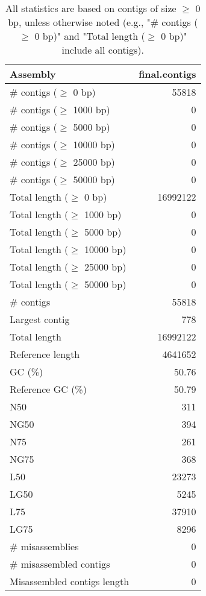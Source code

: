 \documentclass[12pt,a4paper]{article}
\begin{document}
\begin{table}[ht]
\begin{center}
\caption{All statistics are based on contigs of size $\geq$ 0 bp, unless otherwise noted (e.g., "\# contigs ($\geq$ 0 bp)" and "Total length ($\geq$ 0 bp)" include all contigs).}
\begin{tabular}{|l*{1}{|r}|}
\hline
Assembly & final.contigs \\ \hline
\# contigs ($\geq$ 0 bp) & 55818 \\ \hline
\# contigs ($\geq$ 1000 bp) & 0 \\ \hline
\# contigs ($\geq$ 5000 bp) & 0 \\ \hline
\# contigs ($\geq$ 10000 bp) & 0 \\ \hline
\# contigs ($\geq$ 25000 bp) & 0 \\ \hline
\# contigs ($\geq$ 50000 bp) & 0 \\ \hline
Total length ($\geq$ 0 bp) & 16992122 \\ \hline
Total length ($\geq$ 1000 bp) & 0 \\ \hline
Total length ($\geq$ 5000 bp) & 0 \\ \hline
Total length ($\geq$ 10000 bp) & 0 \\ \hline
Total length ($\geq$ 25000 bp) & 0 \\ \hline
Total length ($\geq$ 50000 bp) & 0 \\ \hline
\# contigs & 55818 \\ \hline
Largest contig & 778 \\ \hline
Total length & 16992122 \\ \hline
Reference length & 4641652 \\ \hline
GC (\%) & 50.76 \\ \hline
Reference GC (\%) & 50.79 \\ \hline
N50 & 311 \\ \hline
NG50 & 394 \\ \hline
N75 & 261 \\ \hline
NG75 & 368 \\ \hline
L50 & 23273 \\ \hline
LG50 & 5245 \\ \hline
L75 & 37910 \\ \hline
LG75 & 8296 \\ \hline
\# misassemblies & 0 \\ \hline
\# misassembled contigs & 0 \\ \hline
Misassembled contigs length & 0 \\ \hline

\end{tabular}
\end{center}
\end{table}
\end{document}
